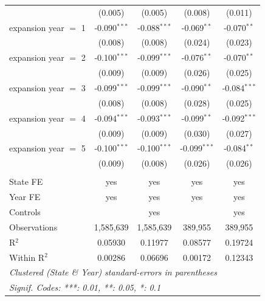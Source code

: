 \documentclass[
]{article}
\begin{document}
\begin{table}[htbp]
\begin{tabular}{lcccc}
                            & (0.005)        & (0.005)                & (0.008)        & (0.011)\\   
      expansion year $=$ 1  & -0.090$^{***}$ & -0.088$^{***}$         & -0.069$^{**}$  & -0.070$^{**}$\\   
                            & (0.008)        & (0.008)                & (0.024)        & (0.023)\\   
      expansion year $=$ 2  & -0.100$^{***}$ & -0.099$^{***}$         & -0.076$^{**}$  & -0.070$^{**}$\\   
                            & (0.009)        & (0.009)                & (0.026)        & (0.025)\\   
      expansion year $=$ 3  & -0.099$^{***}$ & -0.099$^{***}$         & -0.090$^{**}$  & -0.084$^{***}$\\   
                            & (0.008)        & (0.008)                & (0.028)        & (0.025)\\   
      expansion year $=$ 4  & -0.094$^{***}$ & -0.093$^{***}$         & -0.099$^{**}$  & -0.092$^{***}$\\   
                            & (0.009)        & (0.009)                & (0.030)        & (0.027)\\   
      expansion year $=$ 5  & -0.100$^{***}$ & -0.100$^{***}$         & -0.099$^{***}$ & -0.084$^{**}$\\   
                            & (0.009)        & (0.008)                & (0.026)        & (0.026)\\   
       \\
      State FE              & yes            & yes                    & yes            & yes\\  
      Year FE               & yes            & yes                    & yes            & yes\\  
      Controls              &                & yes                    &                & yes\\  
      Observations          & 1,585,639      & 1,585,639              & 389,955        & 389,955\\  
      R$^2$                 & 0.05930        & 0.11977                & 0.08577        & 0.19724\\  
      Within R$^2$          & 0.00286        & 0.06696                & 0.00172        & 0.12343\\  
      \midrule \midrule
      \multicolumn{5}{l}{\emph{Clustered (State \& Year) standard-errors in parentheses}}\\
      \multicolumn{5}{l}{\emph{Signif. Codes: ***: 0.01, **: 0.05, *: 0.1}}\\
   \end{tabular}
\end{table}
\end{document}
